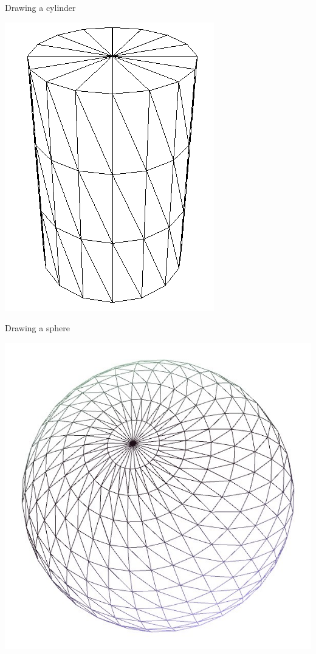 \begin{frame}{Drawing a cylinder}
	\begin{center}
		\includegraphics[height=0.8\textheight]{cylinder}
	\end{center}
\end{frame}

\begin{frame}{Drawing a sphere}
	\begin{center}
		\includegraphics[height=0.8\textheight]{sphere}
	\end{center}
\end{frame}


